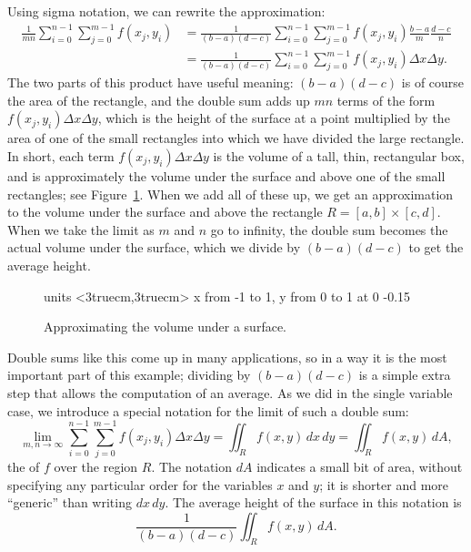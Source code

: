 Using sigma notation, we can rewrite the approximation:
\begin{align*}
\frac{1}{mn}\sum_{i=0}^{n-1}\sum_{j=0}^{m-1}f(x_j,y_i)
  &=\frac{1}{(b-a)(d-c)}\sum_{i=0}^{n-1}\sum_{j=0}^{m-1}f(x_j,y_i)\frac{b-a}{m}\frac{d-c}{n}	\\
  &=\frac{1}{(b-a)(d-c)}\sum_{i=0}^{n-1}\sum_{j=0}^{m-1}f(x_j,y_i)\Delta x\Delta y.
\end{align*}
The two parts of this product have useful meaning: $(b-a)(d-c)$ is of
course the area of the rectangle, and the double sum adds up $mn$
terms of the form $f(x_j,y_i)\Delta x\Delta y$, which is the height of
the surface at a point multiplied by the area of one of the small rectangles
into which we have divided the large rectangle. In short, each term
$f(x_j,y_i)\Delta x\Delta y$ is the volume of a tall, thin,
rectangular box, and is approximately the volume under the surface and
above one of the small rectangles; see Figure~\ref{fig:volumeapproximation}.
When we add all of these up, we get an
approximation to the volume under the surface and above the rectangle
$R=[a,b]\times[c,d]$. When we take the limit as $m$ and $n$ go to
infinity, the double sum becomes the actual volume under the surface,
which we divide by $(b-a)(d-c)$ to get the average height.

\begin{figure}[H]
\centerline{
\vbox{\beginpicture
\normalgraphs
\setcoordinatesystem units <3truecm,3truecm>
\setplotarea x from -1 to 1, y from 0 to 1
 at 0 -0.15
\endpicture}}
\caption{Approximating the volume under a surface.}
\label{fig:volumeapproximation}
\end{figure}

Double sums like this come up in many applications, so in a way it is
the most important part of this example; dividing by $(b-a)(d-c)$ is a
simple extra step that allows the computation of an average. As we did
in the single variable case, we introduce a special notation for the
limit of such a double sum:
\[\lim_{m,n\to\infty} \sum_{i=0}^{n-1}\sum_{j=0}^{m-1}f(x_j,y_i)\Delta
  x\Delta y=\iint_R f(x,y)\,dx\,dy=\iint_R f(x,y)\,dA,\]
the  
of $f$ over the region $R$. The notation $dA$ indicates a small bit of
area, without specifying any particular order for the variables $x$
and $y$; it is shorter and more ``generic'' than writing $dx\,dy$.
The average height of the surface in this notation is 
\[\frac{1}{(b-a)(d-c)}\iint_R f(x,y)\,dA.\]

